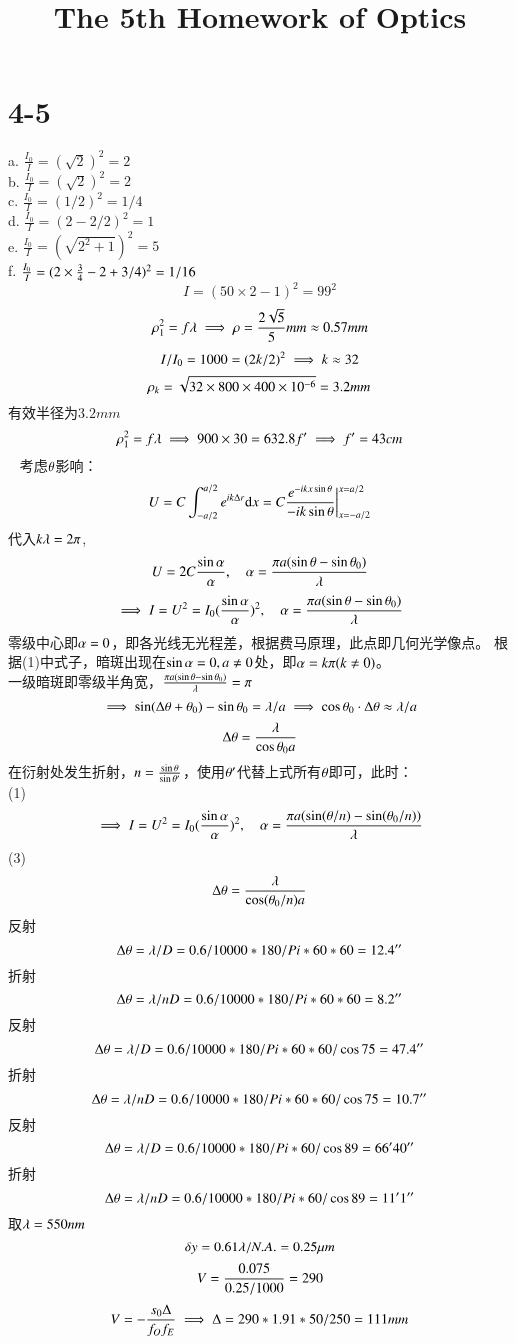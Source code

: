\documentclass[UTF8,9pt]{ctexart}
\title{The 5th Homework of Optics}
\begin{document}
\maketitle
\section{4-5}
a. $\frac{I_0}{I}=(\sqrt{2})^2=2$\\
b. $\frac{I_0}{I}=(\sqrt{2})^2=2$\\
c. $\frac{I_0}{I}=(1/2)^2=1/4$\\
d. $\frac{I_0}{I}=(2-2/2)^2=1$\\
e. $\frac{I_0}{I}=(\sqrt{2^2+1})^2=5$\\
f. $\frac{I_0}{I}=(2 \times \frac{3}{4}-2 + 3/4)^2=1/16$ 
$$I=(50 \times 2-1)^2=99^2$$
$$\rho_1^2=f\lambda \implies \rho=\frac{2\sqrt{5}}{5} mm \approx 0.57mm$$
$$I/I_0=1000=(2k/2)^2 \implies k \approx 32$$
$$\rho_k=\sqrt{32 \times 800 \times 400\times 10^{-6}}=3.2mm$$
有效半径为$3.2mm$
$$\rho_1^2=f\lambda \implies 900 \times 30 = 632.8f' \implies f'=43cm$$\
    考虑$\theta$影响：
    $$U=C\int_{-a/2}^{a/2}e^{ik\Delta r}\mathrm{d} x=C\frac{e^{-ikx\sin\theta}}{-ik\sin\theta}\bigg|^{x=a/2}_{x=-a/2}$$
    代入$k\lambda=2\pi$,
    $$U=2C\frac{\sin\alpha}{\alpha},\quad \alpha=\frac{\pi a (\sin\theta-\sin\theta_0)}{\lambda}$$
    $$\implies I =U^2=I_0(\frac{\sin\alpha}{\alpha})^2,\quad \alpha=\frac{\pi a(\sin\theta-\sin\theta_0)}{\lambda}$$
\sub{(2)}
    零级中心即$\alpha=0$，即各光线无光程差，根据费马原理，此点即几何光学像点。
    根据(1)中式子，暗斑出现在$\sin\alpha=0,a \neq 0$处，即$\alpha=k\pi(k\neq0)$。\\
    一级暗斑即零级半角宽，$\frac{\pi a (\sin\theta-\sin\theta_0)}{\lambda}=\pi$
    $$\implies \sin(\Delta\theta+\theta_0)-\sin\theta_0=\lambda/a \implies \cos\theta_0 \cdot \Delta\theta \approx \lambda/a$$
    $$\Delta\theta=\frac{\lambda}{\cos\theta_0 a}$$
    在衍射处发生折射，$n=\frac{\sin\theta}{\sin\theta'}$，使用$\theta'$代替上式所有$\theta$即可，此时：\\
    (1)    
    $$\implies I =U^2=I_0(\frac{\sin\alpha}{\alpha})^2,\quad \alpha=\frac{\pi a(\sin(\theta/n)-\sin(\theta_0/n))}{\lambda}$$
    (3)
    $$\Delta\theta=\frac{\lambda}{\cos(\theta_0/n) a}$$
    反射
    $$\Delta\theta=\lambda/D=0.6/10000*180/Pi*60*60=12.4''$$
    折射
    $$\Delta\theta=\lambda/nD=0.6/10000*180/Pi*60*60=8.2''$$
    反射
    $$\Delta\theta=\lambda/D=0.6/10000*180/Pi*60*60/\cos75=47.4''$$
    折射
    $$\Delta\theta=\lambda/nD=0.6/10000*180/Pi*60*60/\cos75=10.7''$$
    反射
    $$\Delta\theta=\lambda/D=0.6/10000*180/Pi*60/\cos89=66'40''$$
    折射
    $$\Delta\theta=\lambda/nD=0.6/10000*180/Pi*60/\cos89=11'1''$$
    取$\lambda=550nm$
    $$\delta y=0.61\lambda/N.A.=0.25\mu m $$
    $$V=\frac{0.075}{0.25/1000}=290$$
    $$V=-\frac{s_0\Delta}{f_Of_E}\implies \Delta=290*1.91*50/250=111mm$$
\end{document}
